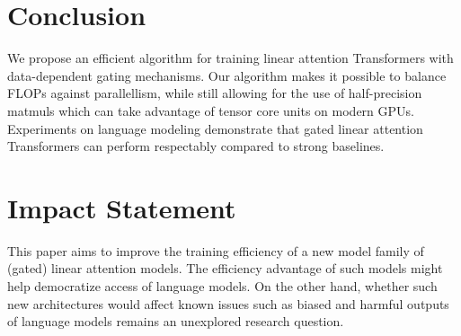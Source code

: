 \section{Conclusion}

We propose an efficient algorithm for training linear attention Transformers with data-dependent gating mechanisms. Our algorithm makes it possible to balance FLOPs against parallellism, while still allowing for the use of half-precision matmuls which can take advantage of tensor core units on modern GPUs. Experiments on language modeling demonstrate that gated linear attention Transformers can perform respectably compared to strong baselines.
\label{sec:conc}

\section*{Impact Statement}

This paper aims to improve the training efficiency of a new model family of (gated) linear attention models. The efficiency advantage of such models might help democratize access of language models. On the other hand, whether such new architectures would affect known issues such as biased and harmful outputs of language models remains an unexplored research question.



